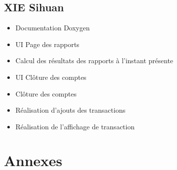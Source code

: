 \documentclass[10pt,a4paper,openany]{report}
\begin{document}
	\subsection{XIE Sihuan}
	\begin{itemize}
		\item Documentation Doxygen
		\item UI Page des rapports
		\item Calcul des résultats des rapports à l'instant présente
		\item UI Clôture des comptes
		\item Clôture des comptes
		\item Réalisation d'ajouts des transactions
		\item Réalisation de l'affichage de transaction
	\end{itemize}

	\section{Annexes}
\end{document}
